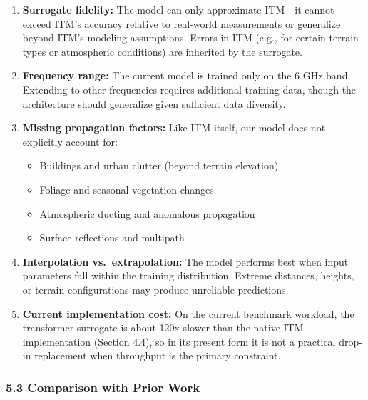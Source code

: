 \documentclass[
]{article}
\providecommand{\tightlist}{%
  \setlength{\itemsep}{0pt}\setlength{\parskip}{0pt}}
\begin{document}
\begin{enumerate}
\def\labelenumi{\arabic{enumi}.}
\item
  \textbf{Surrogate fidelity:} The model can only approximate ITM---it
  cannot exceed ITM's accuracy relative to real-world measurements or
  generalize beyond ITM's modeling assumptions. Errors in ITM (e.g., for
  certain terrain types or atmospheric conditions) are inherited by the
  surrogate.
\item
  \textbf{Frequency range:} The current model is trained only on the 6
  GHz band. Extending to other frequencies requires additional training
  data, though the architecture should generalize given sufficient data
  diversity.
\item
  \textbf{Missing propagation factors:} Like ITM itself, our model does
  not explicitly account for:

  \begin{itemize}
  \tightlist
  \item
    Buildings and urban clutter (beyond terrain elevation)
  \item
    Foliage and seasonal vegetation changes
  \item
    Atmospheric ducting and anomalous propagation
  \item
    Surface reflections and multipath
  \end{itemize}
\item
  \textbf{Interpolation vs.~extrapolation:} The model performs best when
  input parameters fall within the training distribution. Extreme
  distances, heights, or terrain configurations may produce unreliable
  predictions.
\item
  \textbf{Current implementation cost:} On the current benchmark
  workload, the transformer surrogate is about 120x slower than the
  native ITM implementation (Section 4.4), so in its present form it is
  not a practical drop-in replacement when throughput is the primary
  constraint.
\end{enumerate}

\subsubsection{5.3 Comparison with Prior
Work}\label{comparison-with-prior-work}
\end{document}
